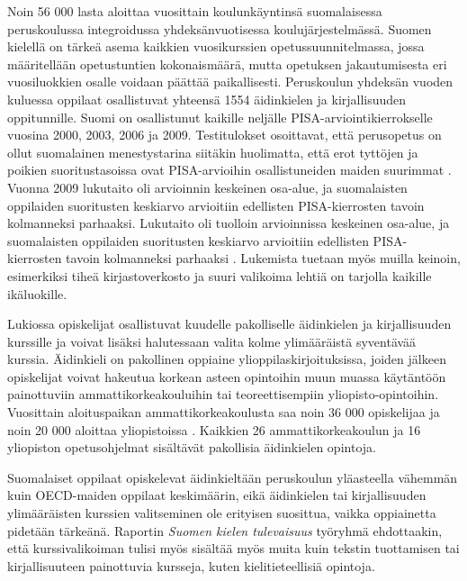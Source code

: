 \documentclass{../../metanetpaper}
\begin{document}
\begin{Parallel}[c]{79mm}{78mm}
{Noin 56 000 lasta aloittaa vuosittain koulunkäyntinsä suomalaisessa
peruskoulussa integroidussa yhdeksänvuotisessa koulujärjestelmässä. Suomen
kielellä on tärkeä asema kaikkien vuosikurssien opetussuunnitelmassa, jossa
määritellään opetustuntien kokonaismäärä, mutta opetuksen jakautumisesta eri
vuosiluokkien osalle voidaan päättää paikallisesti. Peruskoulun yhdeksän vuoden
kuluessa oppilaat osallistuvat yhteensä 1554 äidinkielen ja kirjallisuuden oppitunnille.
Suomi on osallistunut kaikille neljälle PISA-arviointikierrokselle
vuosina 2000, 2003, 2006 ja 2009. Testitulokset osoittavat, että
perusopetus on ollut suomalainen menestystarina siitäkin huolimatta,
että erot tyttöjen ja poikien suoritustasoissa ovat PISA-arvioihin
osallistuneiden maiden suurimmat \cite{Literacy}. Vuonna 2009 lukutaito 
oli arvioinnin keskeinen osa-alue, ja suomalaisten oppilaiden
suoritusten keskiarvo arvioitiin edellisten PISA-kierrosten tavoin
kolmanneksi parhaaksi. Lukutaito oli tuolloin arvioinnissa keskeinen osa-alue, 
ja suomalaisten oppilaiden suoritusten keskiarvo
arvioitiin edellisten PISA-kierrosten tavoin kolmanneksi parhaaksi
\cite{Pisa2006}. Lukemista tuetaan myös muilla keinoin,
esimerkiksi tiheä kirjastoverkosto ja suuri valikoima lehtiä on
tarjolla kaikille ikäluokille.

Lukiossa opiskelijat osallistuvat kuudelle pakolliselle
äidinkielen ja kirjallisuuden kurssille ja voivat lisäksi
halutessaan valita kolme ylimääräistä syventävää kurssia. Äidinkieli
on pakollinen oppiaine ylioppilaskirjoituksissa, joiden jälkeen
opiskelijat voivat hakeutua korkean asteen opintoihin muun muassa
käytäntöön painottuviin ammattikorkeakouluihin tai teoreettisempiin
yliopisto-opintoihin. Vuosittain aloituspaikan ammattikorkeakoulusta
saa noin 36 000 opiskelijaa ja noin 20 000 aloittaa yliopistoissa
\cite{Education}. Kaikkien 26 ammattikorkeakoulun ja 16 yliopiston
opetusohjelmat sisältävät pakollisia äidinkielen opintoja.

Suomalaiset oppilaat opiskelevat äidinkieltään peruskoulun yläasteella
vähemmän kuin OECD-maiden oppilaat keskimäärin, eikä äidinkielen tai
kirjallisuuden ylimääräisten kurssien valitseminen ole 
erityisen suosittua, vaikka oppiainetta pidetään tärkeänä. Raportin
\textit{Suomen kielen tulevaisuus} \cite{Tulevaisuus2009} työryhmä
ehdottaakin, että kurssivalikoiman tulisi myös sisältää myös muita
kuin tekstin tuottamisen tai kirjallisuuteen painottuvia kursseja,
kuten kielitieteellisiä opintoja.

}
\end{Parallel}
\end{document}
